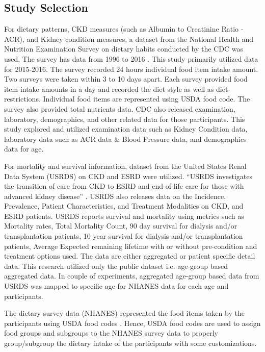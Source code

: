 \subsection*{Study Selection}
For dietary patterns, CKD measures (such as Albumin to Creatinine Ratio - ACR), and Kidney condition measures, a dataset from the National Health and Nutrition Examination Survey on dietary habits conducted by the CDC \cite{CDC2015} was used. The survey has data from 1996 to 2016 \cite{CDC2015}. This study primarily utilized data for 2015-2016. The survey recorded 24 hours individual food item intake amount. Two surveys were taken within 3 to 10 days apart. Each survey provided food item intake amounts in a day and recorded the diet style as well as diet-restrictions. Individual food items are represented using USDA food code. The survey also provided total nutrients data. CDC also released examination, laboratory, demographics, and other related data for those participants. This study explored and utilized examination data such as Kidney Condition data, laboratory data such as ACR data \& Blood Pressure data, and demographics data for age.
 
For mortality and survival information, dataset from the United States Renal Data System (USRDS) on CKD and ESRD \cite{USRDS2015} \cite{USRDS2018} were utilized. “USRDS investigates the transition of care from CKD to ESRD and end-of-life care for those with advanced kidney disease” \cite{USRDSAnnual2018}. USRDS also releases data on the Incidence, Prevalence, Patient Characteristics, and Treatment Modalities on CKD, and ESRD patients. USRDS  reports survival and mortality using metrics such as Mortality rates, Total Mortality Count,  90 day survival for dialysis and/or transplantation patients,  10 year survival for dialysis and/or transplantation patients, Average Expected remaining lifetime with or without pre-condition and treatment options used.  The data are either aggregated or patient specific detail data. This research utilized only the public dataset i.e. age-group based aggregated data. In couple of experiments, aggregated age-group based data from USRDS was mapped to specific age for NHANES data for each age and participants.

The dietary survey data (NHANES) represented the food items taken by the participants using USDA food codes \cite{ARS2016} \cite{CDC2004} \cite{USDA2010}. Hence, USDA food codes \cite{ARS2016} \cite{CDC2004} \cite{USDA2010} are used to assign food groups and subgroups to the NHANES \cite{CDC2015} survey data to properly group/subgroup the dietary intake of the participants with some customizations.

